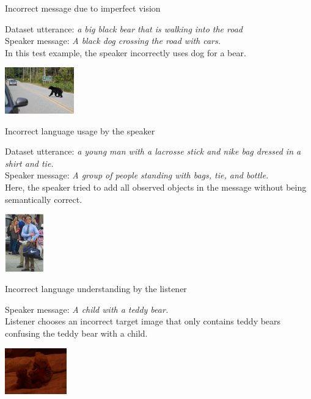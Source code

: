 \documentclass{article}
\begin{document}
\begin{itemize}
\begin{minipage}{0.7\textwidth}
\item Incorrect message due to imperfect vision

Dataset utterance: \emph{a big black bear that is walking into the road} \\
Speaker message: \emph{A black dog crossing the road with cars.} \\
In this test example, the speaker incorrectly uses dog for a bear.
\end{minipage}
\begin{minipage}{0.2\textwidth}
    \centering
    \includegraphics[width=0.98\linewidth, height=2cm]{figs/failure1.jpeg}
\end{minipage}

\begin{minipage}{0.7\textwidth}
\item Incorrect language usage by the speaker

Dataset utterance: \emph{a young man with a lacrosse stick and nike bag dressed in a shirt and tie.} \\
Speaker message: \emph{A group of people standing with bags, tie, and bottle.} \\
Here, the speaker tried to add all observed objects in the message without being semantically correct.
\end{minipage}
\;
\begin{minipage}{0.18\textwidth}
    \centering
    \includegraphics[width=0.98\linewidth, height=2.5cm]{figs/failure2.jpeg}
\end{minipage}

\begin{minipage}{0.7\textwidth}
\item Incorrect language understanding by the listener

Speaker message: \emph{A child with a teddy bear.} \\
Listener chooses an incorrect target image that only contains teddy bears confusing the teddy bear with a child.
\end{minipage}
\begin{minipage}{0.2\textwidth}
    \centering
    \includegraphics[width=0.98\linewidth, height=2cm]{figs/failure3.jpeg}
\end{minipage}
\end{itemize}
\end{document}
